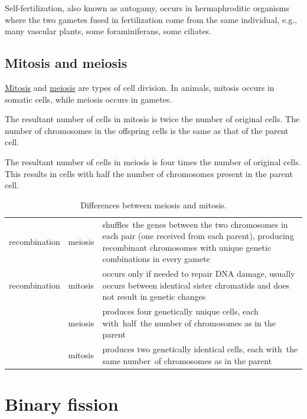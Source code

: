 Self-fertilization, also known as autogamy, occurs in hermaphroditic organisms where the two gametes fused in fertilization come from the same individual, e.g., many vascular plants, some foraminiferans, some ciliates.

\hypertarget{mitosis-and-meiosis}{%
\subsection{Mitosis and meiosis}\label{mitosis-and-meiosis}}

\href{https://en.wikipedia.org/wiki/Mitosis}{Mitosis} and \href{https://en.wikipedia.org/wiki/Meiosis}{meiosis} are types of cell division. In animals, mitosis occurs in somatic cells, while meiosis occurs in gametes.

The resultant number of cells in mitosis is twice the number of original cells. The number of chromosomes in the offspring cells is the same as that of the parent cell.

The resultant number of cells in meiosis is four times the number of original cells. This results in cells with half the number of chromosomes present in the parent cell.

\begin{longtable}[t]{>{\raggedright\arraybackslash}p{10em}>{\raggedright\arraybackslash}p{5em}>{\raggedright\arraybackslash}p{20em}}
\caption{\label{tab:mitomeio}Differences between meiosis and mitosis.}\\
\toprule
\rowcolor{gray!6}  recombination & meiosis & shuffles the genes between the two chromosomes in each pair (one received from each parent), producing recombinant chromosomes with unique genetic combinations in every gamete\\
\rowcolor{gray!6}
recombination & mitosis & occurs only if needed to repair DNA damage, usually occurs between identical sister chromatids and does not result in genetic changes\\
\cmidrule{1-3}
\rowcolor{gray!6}   & meiosis & produces four genetically unique cells, each with half the number of chromosomes as in the parent\\
\rowcolor{gray!6}

\multirow{-2}{*}{\raggedright\arraybackslash chromosome number} & mitosis & produces two genetically identical cells, each with the same number of chromosomes as in the parent\\
\bottomrule
\end{longtable}

\hypertarget{binary-fission}{%
\section{Binary fission}\label{binary-fission}}

